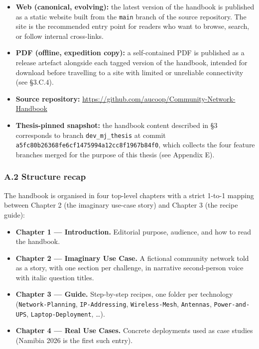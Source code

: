 \begin{itemize}
\tightlist
\item
  \textbf{Web (canonical, evolving):} the latest version of the handbook
  is published as a static website built from the \texttt{main} branch
  of the source repository. The site is the recommended entry point for
  readers who want to browse, search, or follow internal cross-links.
\item
  \textbf{PDF (offline, expedition copy):} a self-contained PDF is
  published as a release artefact alongside each tagged version of the
  handbook, intended for download before travelling to a site with
  limited or unreliable connectivity (see §3.C.4).
\item
  \textbf{Source repository:}
  \url{https://github.com/aucoop/Community-Network-Handbook}
\item
  \textbf{Thesis-pinned snapshot:} the handbook content described in §3
  corresponds to branch \texttt{dev\_mj\_thesis} at commit
  \texttt{a5fc80b26368fe6cf1475994a12cc8f1967b84f0}, which collects the
  four feature branches merged for the purpose of this thesis (see
  Appendix E).
\end{itemize}

\hypertarget{a.2-structure-recap}{%
\subsubsection{A.2 Structure recap}\label{a.2-structure-recap}}

The handbook is organised in four top-level chapters with a strict
1-to-1 mapping between Chapter 2 (the imaginary use-case story) and
Chapter 3 (the recipe guide):

\begin{itemize}
\tightlist
\item
  \textbf{Chapter 1 --- Introduction.} Editorial purpose, audience, and
  how to read the handbook.
\item
  \textbf{Chapter 2 --- Imaginary Use Case.} A fictional community
  network told as a story, with one section per challenge, in narrative
  second-person voice with italic question titles.
\item
  \textbf{Chapter 3 --- Guide.} Step-by-step recipes, one folder per
  technology (\texttt{Network-Planning}, \texttt{IP-Addressing},
  \texttt{Wireless-Mesh}, \texttt{Antennas}, \texttt{Power-and-UPS},
  \texttt{Laptop-Deployment}, \ldots).
\item
  \textbf{Chapter 4 --- Real Use Cases.} Concrete deployments used as
  case studies (Namibia 2026 is the first such entry).
\end{itemize}

